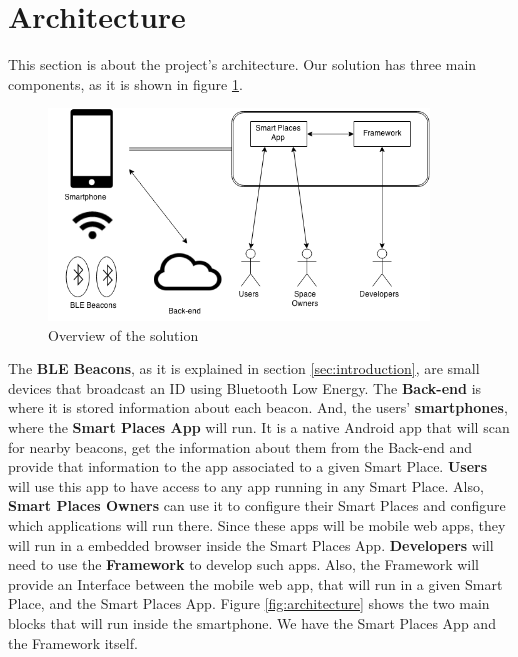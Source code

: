 
% 
% 


\section{Architecture}
\label{sec:architecture}
This section is about the project's architecture.
Our solution has three main components,
as it is shown in figure \ref{fig:overview_architecture}.
\begin{figure}[!ht]
  \centering
    \includegraphics[width=0.9\textwidth]{img/overview_architecture}
    \caption{Overview of the solution}
    \label{fig:overview_architecture}
\end{figure}

The \textbf{BLE Beacons}, as it is explained in section 
\ref{sec:introduction}, are small devices that broadcast
an ID using Bluetooth Low Energy. The \textbf{Back-end} is where it is
stored information about each beacon. And, the users'
\textbf{smartphones}, where the \textbf{Smart Places App} will run.
It is a native Android app that will scan for nearby beacons,
get the information about them from the Back-end and
provide that information to the app associated to a 
given Smart Place.
\textbf{Users} will use this app to have access
to any app running in any Smart Place.
Also, \textbf{Smart Places Owners} can use it to configure
their Smart Places and configure which applications
will run there.
Since these apps will be mobile web apps, they will run
in a embedded browser inside the Smart Places App.
\textbf{Developers} will need to use the \textbf{Framework} to
develop such apps. Also, the Framework will provide an
Interface between the mobile web app, that will run
in a given Smart Place, and the Smart Places App.
Figure \ref{fig:architecture} shows the two main
blocks that will run inside the smartphone.
We have the Smart Places App and the Framework itself.

